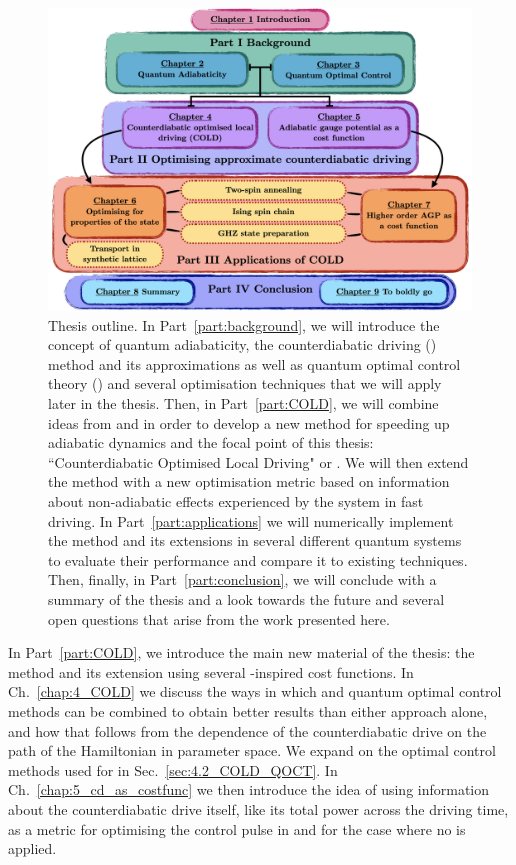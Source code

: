 \begin{figure}[t!]
    \centering
    \includegraphics[width=\linewidth]{images/thesis_overview.png} \caption[Thesis outline.]{Thesis outline. In Part~\ref{part:background}, we will introduce the concept of quantum adiabaticity, the counterdiabatic driving () method and its approximations as well as quantum optimal control theory () and several optimisation techniques that we will apply later in the thesis. Then, in Part~\ref{part:COLD}, we will combine ideas from  and  in order to develop a new method for speeding up adiabatic dynamics and the focal point of this thesis: ``Counterdiabatic Optimised Local Driving" or . We will then extend the method with a new optimisation metric based on information about non-adiabatic effects experienced by the system in fast driving. In Part~\ref{part:applications} we will numerically implement the  method and its extensions in several different quantum systems to evaluate their performance and compare it to existing techniques. Then, finally, in Part~\ref{part:conclusion}, we will conclude with a summary of the thesis and a look towards the future and several open questions that arise from the work presented here.}\label{fig:thesis_overview}
\end{figure}

In Part~\ref{part:COLD}, we introduce the main new material of the thesis: the  method and its extension using several -inspired cost functions. In Ch.~\ref{chap:4_COLD} we discuss the ways in which  and quantum optimal control methods can be combined to obtain better results than either approach alone, and how that follows from the dependence of the counterdiabatic drive on the path of the Hamiltonian in parameter space. We expand on the optimal control methods used for  in Sec.~\ref{sec:4.2_COLD_QOCT}. In Ch.~\ref{chap:5_cd_as_costfunc} we then introduce the idea of using information about the counterdiabatic drive itself, like its total power across the driving time, as a metric for optimising the control pulse in  and for the case where no  is applied.

